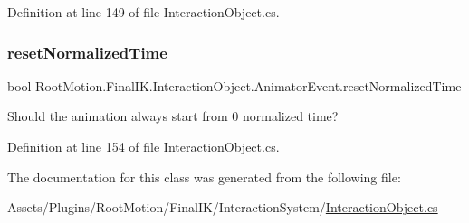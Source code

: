 Definition at line 149 of file Interaction\+Object.\+cs.

\mbox{\label{class_root_motion_1_1_final_i_k_1_1_interaction_object_1_1_animator_event_aa4b2d2b6eb5f378d75a422d8aeaa4c3b}} 
\subsubsection{\texorpdfstring{reset\+Normalized\+Time}{resetNormalizedTime}}
{\footnotesize\ttfamily bool Root\+Motion.\+Final\+I\+K.\+Interaction\+Object.\+Animator\+Event.\+reset\+Normalized\+Time}



Should the animation always start from 0 normalized time? 



Definition at line 154 of file Interaction\+Object.\+cs.



The documentation for this class was generated from the following file\+:\begin{DoxyCompactItemize}
\item 
Assets/\+Plugins/\+Root\+Motion/\+Final\+I\+K/\+Interaction\+System/\mbox{\hyperlink{_interaction_object_8cs}{Interaction\+Object.\+cs}}\end{DoxyCompactItemize}

